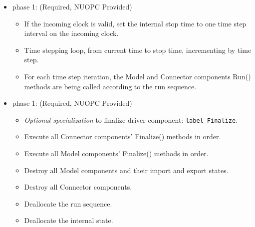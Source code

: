 \begin{itemize}
\item phase 1: ({\sc Required, NUOPC Provided})
  \begin{itemize}
  \item If the incoming clock is valid, set the internal stop time to one time step interval on the incoming clock.
  \item Time stepping loop, from current time to stop time, incrementing by time step.
  \item For each time step iteration, the Model and Connector components Run() methods are being called according to the run sequence.
  \end{itemize}    
\end{itemize}

\begin{itemize}
\item phase 1: ({\sc Required, NUOPC Provided})
  \begin{itemize}
  \item {\it Optional specialization} to finalize driver component: {\tt label\_Finalize}.
  \item Execute all Connector components' Finalize() methods in order.
  \item Execute all Model components' Finalize() methods in order.
  \item Destroy all Model components and their import and export states.
  \item Destroy all Connector components.
  \item Deallocate the run sequence.
  \item Deallocate the internal state.
  \end{itemize}      
\end{itemize}


